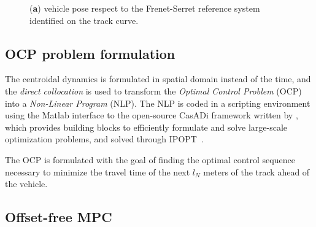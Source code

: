 \documentclass[conference]{IEEEtran} %
\begin{document}
\begin{figure}[htb] \centering
	\caption{(\textbf{a}) vehicle pose respect to the Frenet-Serret reference system identified on the track curve.}
	\label{fig:scheme_frenet_serret}
\end{figure}


\subsection{OCP problem formulation}

The centroidal dynamics is formulated in spatial domain instead of the time, and the \emph{direct collocation} is used to transform the \emph{Optimal Control Problem} (OCP) into a \emph{Non-Linear Program} (NLP). The NLP is coded in a scripting environment using the Matlab interface to the open-source CasADi framework written by \citet{Andersson2019}, which provides building
blocks to efficiently formulate and solve large-scale optimization problems, and solved through IPOPT~\cite{Wachter2006}.

The OCP is formulated with the goal of finding the optimal control sequence necessary to minimize the travel time of the next $l_N$ meters of the track ahead of the vehicle.

\subsection{Offset-free MPC}
\label{sec:offsetfree}


\end{document}
